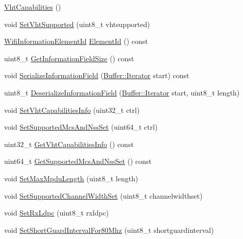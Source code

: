 \begin{DoxyCompactItemize}
\item 
\hyperlink{classns3_1_1VhtCapabilities_a21985776259d05450791717fbabb93a1}{Vht\+Capabilities} ()
\item 
void \hyperlink{classns3_1_1VhtCapabilities_a01ed2addd76b9af5c7f29ec85c4ccf63}{Set\+Vht\+Supported} (uint8\+\_\+t vhtsupported)
\item 
\hyperlink{namespacens3_aeb185e0c8a60816016bca079f1420478}{Wifi\+Information\+Element\+Id} \hyperlink{classns3_1_1VhtCapabilities_a0e29afd50e75bace2aff1b2328a93758}{Element\+Id} () const 
\item 
uint8\+\_\+t \hyperlink{classns3_1_1VhtCapabilities_aeafa301000c4a99f5c1c3d9e85ed0403}{Get\+Information\+Field\+Size} () const 
\item 
void \hyperlink{classns3_1_1VhtCapabilities_aa58afc40bda6d6d0c7c25f7d138fb34e}{Serialize\+Information\+Field} (\hyperlink{classns3_1_1Buffer_1_1Iterator}{Buffer\+::\+Iterator} start) const 
\item 
uint8\+\_\+t \hyperlink{classns3_1_1VhtCapabilities_a74e180ae128b0649a30c9ba7a718049f}{Deserialize\+Information\+Field} (\hyperlink{classns3_1_1Buffer_1_1Iterator}{Buffer\+::\+Iterator} start, uint8\+\_\+t length)
\item 
void \hyperlink{classns3_1_1VhtCapabilities_a0bf9ec66f4e2fbdb13875d7ee08fb78f}{Set\+Vht\+Capabilities\+Info} (uint32\+\_\+t ctrl)
\item 
void \hyperlink{classns3_1_1VhtCapabilities_ae41856a0b283092b85279ade016e5a03}{Set\+Supported\+Mcs\+And\+Nss\+Set} (uint64\+\_\+t ctrl)
\item 
uint32\+\_\+t \hyperlink{classns3_1_1VhtCapabilities_aafb7abf38313a6d4054fc993351c04ed}{Get\+Vht\+Capabilities\+Info} () const 
\item 
uint64\+\_\+t \hyperlink{classns3_1_1VhtCapabilities_a9bbef9140351d5ff10f2ea204a4db754}{Get\+Supported\+Mcs\+And\+Nss\+Set} () const 
\item 
void \hyperlink{classns3_1_1VhtCapabilities_a857a051f560a8e27d77a4565a4b95949}{Set\+Max\+Mpdu\+Length} (uint8\+\_\+t length)
\item 
void \hyperlink{classns3_1_1VhtCapabilities_af4d56346754cf93933657aff3e573649}{Set\+Supported\+Channel\+Width\+Set} (uint8\+\_\+t channelwidthset)
\item 
void \hyperlink{classns3_1_1VhtCapabilities_a09888e0b861e85fb5f5a366f860db50b}{Set\+Rx\+Ldpc} (uint8\+\_\+t rxldpc)
\item 
void \hyperlink{classns3_1_1VhtCapabilities_a7d76403b894a6374af41740730b93837}{Set\+Short\+Guard\+Interval\+For80\+Mhz} (uint8\+\_\+t shortguardinterval)

\end{DoxyCompactItemize}
